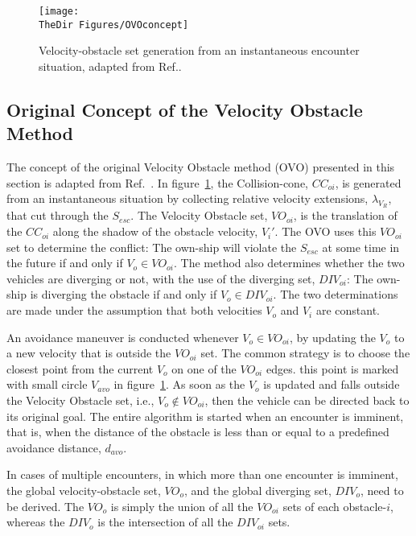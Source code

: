 \begin{figure}[h]
\centering
 \texttt{[image: \\TheDir Figures/OVOconcept]}
 \caption{Velocity-obstacle set generation from an instantaneous encounter situation, adapted from Ref.\cite{Fiorini:98}.}
 \label{f:OVOconcept}
\end{figure}

\subsection{Original Concept of the Velocity Obstacle Method}
The concept of the original Velocity Obstacle method (OVO) presented in this section is adapted from Ref.~\cite{Fiorini:98}. In figure~\ref{f:OVOconcept}, the Collision-cone, $CC_{oi}$, is generated from an instantaneous situation by collecting relative velocity extensions, $\lambda_{V_R}$, that cut through the $S_{esc}$. The Velocity Obstacle set, $VO_{oi}$, is the translation of the $CC_{oi}$ along the shadow of the obstacle velocity, $V_i'$. The OVO uses this $VO_{oi}$ set to determine the conflict: The own-ship will violate the $S_{esc}$ at some time in the future if and only if $V_o \in VO_{oi}$. The method also determines whether the two vehicles are diverging or not, with the use of the diverging set, $DIV_{oi}$: The own-ship is diverging the obstacle if and only if $V_o \in DIV_{oi}$. The two determinations are made under the assumption that both velocities $V_o$ and $V_i$ are constant.

An avoidance maneuver is conducted whenever $V_o \in VO_{oi}$, by updating the $V_o$ to a new velocity that is outside the $VO_{oi}$ set. The common strategy is to choose the closest point from the current $V_o$ on one of the $VO_{oi}$ edges. this point is marked with small circle $V_{avo}$ in figure~\ref{f:OVOconcept}. As soon as the $V_o$ is updated and falls outside the Velocity Obstacle set, i.e., $V_o \notin VO_{oi}$, then the vehicle can be directed back to its original goal. The entire algorithm is started when an encounter is imminent, that is, when the distance of the obstacle is less than or equal to a predefined avoidance distance, $d_{avo}$. 

In cases of multiple encounters, in which more than one encounter is imminent, the global velocity-obstacle set, $VO_o$, and the global diverging set, $DIV_{o}$, need to be derived. The $VO_o$ is simply the union of all the $VO_{oi}$ sets of each obstacle-$i$, whereas the $DIV_o$ is the intersection of all the $DIV_{oi}$ sets. 

